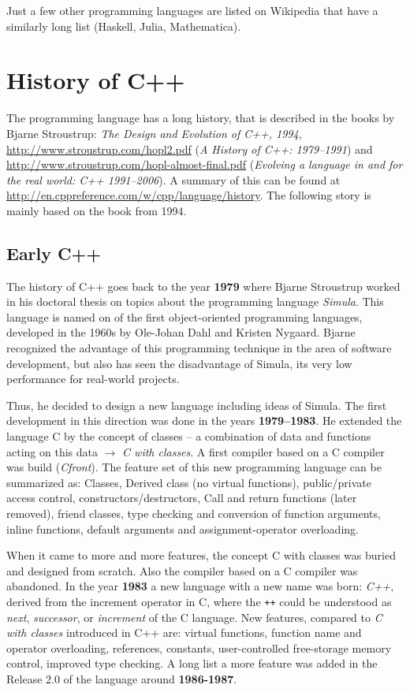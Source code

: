 Just a few other programming languages are listed on Wikipedia that have a similarly long list (Haskell, Julia, Mathematica).


\section{History of C++}
The programming language has a long history, that is described in the books by Bjarne Stroustrup: \emph{The Design and Evolution of C++, 1994},
\url{http://www.stroustrup.com/hopl2.pdf} (\emph{A History of C++: 1979--1991}) and \url{http://www.stroustrup.com/hopl-almost-final.pdf}
(\emph{Evolving a language in and for the real world: C++ 1991--2006}). A summary of this can be found at
\url{http://en.cppreference.com/w/cpp/language/history}. The following story is mainly based on the book from 1994.

\subsection{Early C++}
The history of C++ goes back to the year \textbf{1979} where Bjarne Stroustrup worked in his doctoral thesis on topics about the
programming language \emph{Simula}. This language is named on of the first object-oriented programming languages, developed in the
1960s by Ole-Johan Dahl and Kristen Nygaard. Bjarne recognized the advantage of this programming technique in the area of software
development, but also has seen the disadvantage of Simula, its very low performance for real-world projects.

Thus, he decided to design a new language including ideas of Simula. The first development in this direction was done in the years
\textbf{1979--1983}. He extended the language C by the concept of classes -- a combination of data and functions acting on this data
$\rightarrow$ \textit{C with classes}. A first compiler based on a C compiler was build (\textit{Cfront}). The feature set of this new
programming language can be summarized as: Classes, Derived class (no virtual functions), public/private access control,
constructors/destructors, Call and return functions (later removed), friend classes, type checking and conversion of function arguments,
inline functions, default arguments and assignment-operator overloading.

When it came to more and more features, the concept C with classes was buried and designed from scratch. Also the compiler based on a C compiler
was abandoned. In the year \textbf{1983} a new language with a new name was born: \textit{C++}, derived from the increment operator in C,
where the \texttt{++} could be understood as \emph{next}, \emph{successor}, or \emph{increment} of the C language. New features, compared
to \emph{C with classes} introduced in C++ are: virtual functions, function name and operator overloading, references, constants,
user-controlled free-storage memory control, improved type checking. A long list a more feature was added in the Release 2.0 of the language
around \textbf{1986-1987}.

